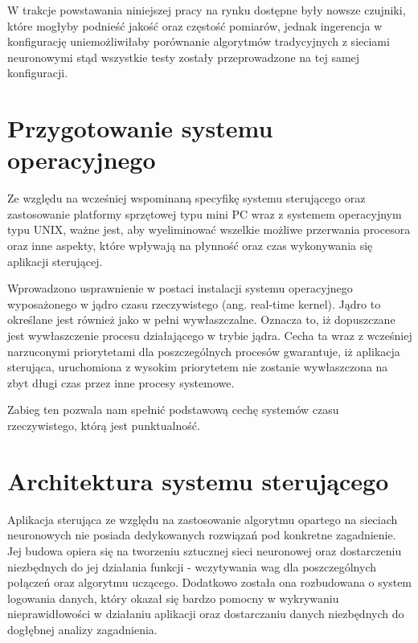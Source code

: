 W trakcje powstawania niniejszej pracy na rynku dostępne były nowsze czujniki, które mogłyby podnieść jakość oraz częstość pomiarów, jednak ingerencja w konfigurację uniemożliwiłaby porównanie algorytmów tradycyjnych z sieciami neuronowymi stąd wszystkie testy zostały przeprowadzone na tej samej konfiguracji.




\section{Przygotowanie systemu operacyjnego}
Ze względu na wcześniej wspominaną specyfikę systemu sterującego oraz zastosowanie platformy sprzętowej typu mini PC wraz z systemem operacyjnym typu UNIX, ważne jest, aby wyeliminować wszelkie możliwe przerwania procesora oraz inne aspekty, które wpływają na płynność oraz czas wykonywania się aplikacji sterującej.

Wprowadzono usprawnienie w postaci instalacji systemu operacyjnego wyposażonego w jądro czasu rzeczywistego (ang. real-time kernel). Jądro to określane jest również jako w pełni wywłaszczalne. Oznacza to, iż dopuszczane jest wywłaszczenie procesu działającego w trybie jądra. Cecha ta wraz z wcześniej narzuconymi priorytetami dla poszczególnych procesów gwarantuje, iż aplikacja sterująca, uruchomiona z wysokim priorytetem nie zostanie wywłaszczona na zbyt długi czas przez inne procesy systemowe.


Zabieg ten pozwala nam spełnić podstawową cechę systemów czasu rzeczywistego, którą jest punktualność.

\section{Architektura systemu sterującego}

Aplikacja sterująca ze względu na zastosowanie algorytmu opartego na sieciach neuronowych nie posiada dedykowanych rozwiązań pod konkretne zagadnienie. Jej budowa opiera się na tworzeniu sztucznej sieci neuronowej oraz dostarczeniu niezbędnych do jej działania funkcji - wczytywania wag dla poszczególnych połączeń oraz algorytmu uczącego. Dodatkowo została ona rozbudowana o system logowania danych, który okazał się bardzo pomocny w wykrywaniu nieprawidłowości w działaniu aplikacji oraz dostarczaniu danych niezbędnych do dogłębnej analizy zagadnienia.

